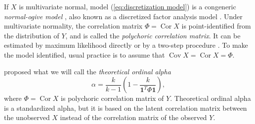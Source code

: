 \documentclass[twoside]{article}
\DeclareMathOperator{\Cor}{Cor}
\DeclareMathOperator{\Cov}{Cov}
\begin{document}
If $X$ is multivariate normal, model (\ref{eq:discretization model})
is a congeneric \textit{normal-ogive model} \citep{Swaminathan2016-rg}, also known as a discretized factor analysis model \citep{Takane1987-pq}.
Under multivariate normality, the correlation matrix $\Phi=\Cor X$ is point-identified
from the distribution of $Y$, and is called the \textit{polychoric
correlation matrix}. It can be estimated by maximum likelihood directly
or by a two-step procedure \citep{Olsson1979-ti}. To make the model
identified, usual practice is to assume that $\Cov X = \Cor X = \Phi$. 

\citet{Zumbo2007-ap} proposed what we will call the \textit{theoretical ordinal
alpha}
\begin{equation}
\alpha=\frac{k}{k-1}\left(1-\frac{k}{\boldsymbol{1}^{T}\Phi\boldsymbol{1}}\right), \label{eq:ordinal alpha}
\end{equation}
where $\Phi=\Cor X$ is polychoric correlation matrix of $Y$.
Theoretical ordinal alpha is a standardized alpha, but it is based
on the latent correlation matrix between the unobserved $X$ instead
of the correlation matrix of the observed $Y$. 


 
 
\end{document}
